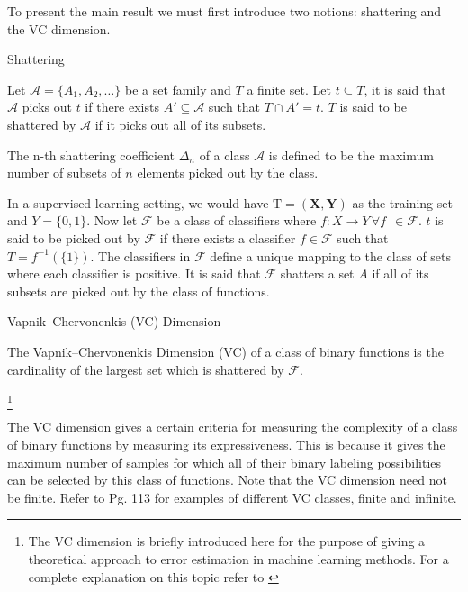 To present the main result we must first introduce two notions: shattering and the VC dimension.

\begin{definition}{Shattering}

Let $\mathcal {A}= \{A_1,A_{2},\dots \}$ be a set family and $T$ a finite set. Let $t \subseteq T$, it is said that $\mathcal {A}$ picks out $t$ if there exists $A' \subseteq \mathcal {A} $ such that $ T \cap A' = t$. $T$ is said to be shattered by $\mathcal {A}$ if it picks out all of its subsets.

\end{definition}
 
The n-th shattering coefficient $\Delta_n$ of a class $\mathcal {A}$ is defined to be the maximum number of subsets of $n$ elements picked out by the class. 

In a supervised learning setting, we would have $\mathrm{T} = (\textbf{X},\textbf{Y})$ as the training set and $Y = \{0,1 \}$. Now let $\mathcal {F}$ be a class of classifiers where $f: X \rightarrow Y \, \forall f \ \ \in \mathcal {F}$. $t$ is said to be picked out by $\mathcal {F}$ if there exists a classifier $f \in \mathcal {F}$ such that $T = f^{-1}(\{1\})$. The classifiers in $\mathcal {F}$ define a unique mapping to the class of sets where each classifier is positive. It is said that $\mathcal {F}$ shatters a set $A$ if all of its subsets are picked out by the class of functions.

\begin{definition}{Vapnik–Chervonenkis (VC) Dimension}
 	
The Vapnik–Chervonenkis Dimension (VC) of a class of binary functions is the cardinality of the largest set which is shattered by $\mathcal {F}$.
\end{definition}\footnote{The VC dimension is briefly introduced here for the purpose of giving a theoretical approach to error estimation in machine learning methods. For a complete explanation on this topic refer to \cite{vapnik-nature2013}}

The VC dimension gives a certain criteria for measuring the complexity of a class of binary functions by measuring its expressiveness. This is because it gives the maximum number of samples for which all of their binary labeling possibilities can be selected by this class of functions.
Note that the VC dimension need not be finite. Refer to \cite{cherkassky-learning2007} Pg. 113 for examples of different VC classes, finite and infinite.


